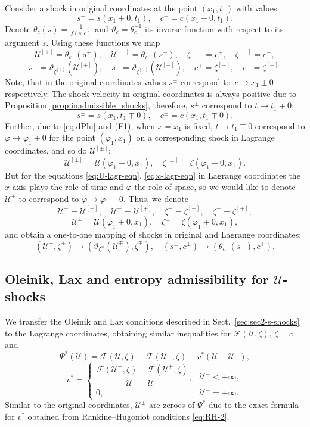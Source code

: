 \documentclass[12pt]{article}
\theoremstyle{definition}
\begin{document}
Consider a shock in original coordinates at the point $(x_1, t_1)$ with values
\[
s^\pm = s(x_1\pm 0, t_1), \quad c^\pm = c(x_1\pm 0, t_1).
\]
Denote $\theta_c(s) = \frac{1}{f(s,c)}$ and $\vartheta_c = \theta_c^{-1}$ its inverse function with respect to its argument $s$. Using these functions we map
\[
\mathcal U^{[+]} = \theta_{c^+}(s^+), \quad \mathcal U^{[-]} = \theta_{c^-}(s^-), \quad \zeta^{[+]} = c^+, \quad \zeta^{[-]} = c^-,
\]
\[s^+ = \vartheta_{\zeta^{[+]}}(\mathcal U^{[+]}), \quad s^- = \vartheta_{\zeta^{[-]}}(\mathcal U^{[-]}), \quad c^+ = \zeta^{[+]}, \quad c^- = \zeta^{[-]}. 
\]
Note, that in the original coordinates values $s^\pm$ correspond to $x\to x_1\pm 0$ respectively. The shock velocity in original coordinates is always positive due to Proposition \ref{prop:inadmissible_shocks}, therefore, $s^\pm$ correspond to $t\to t_1\mp 0$:
\[
s^\pm = s(x_1, t_1 \mp 0), \quad c^\pm = c(x_1, t_1\mp 0).
\]
Further, due to \eqref{eq:dPhi} and (F1), when $x = x_1$ is fixed, $t\to t_1\mp 0$ correspond to $\varphi\to \varphi_1\mp 0$ for the point $(\varphi_1, x_1)$ on a corresponding shock in Lagrange coordinates, and so do $\mathcal U^{[\pm]}$:
\[
\mathcal U^{[\pm]} = \mathcal U(\varphi_1 \mp 0, x_1), \quad \zeta^{[\pm]} = \zeta(\varphi_1 \mp 0, x_1).
\]
But for the equations \eqref{eq:U-lagr-eqn}, \eqref{eq:c-lagr-eqn} in Lagrange coordinates the $x$ axis plays the role of time and $\varphi$ the role of space, so we would like to denote $\mathcal U^\pm$ to correspond to $\varphi\to \varphi_1\pm 0$. Thus, we denote
\[
\mathcal U^+ = \mathcal U^{[-]}, \quad \mathcal U^- = \mathcal U^{[+]}, \quad \zeta^+ = \zeta^{[-]}, \quad \zeta^- = \zeta^{[+]},
\]
\[
\mathcal U^{\pm} = \mathcal U(\varphi_1 \pm 0, x_1), \quad \zeta^{\pm} = \zeta(\varphi_1 \pm 0, x_1),
\]
and obtain a one-to-one mapping of shocks in original and Lagrange coordinates:
\begin{equation}\label{shock_mapping}
(\mathcal U^\pm, \zeta^\pm) \to (\vartheta_{\zeta^\mp}(\mathcal U^\mp), \zeta^\mp), \quad (s^\pm, c^\pm) \to (\theta_{c^\mp}(s^\mp), c^\mp).
\end{equation}
 

\subsection{Oleinik, Lax and entropy admissibility for $\mathcal U$-shocks}
\label{sec:sec2-s-shock-admissibility}


We transfer the Oleinik and Lax conditions described in Sect.~\ref{sec:sec2-s-shocks} to the Lagrange coordinates, obtaining similar inequalities for $\mathcal F(\mathcal U, \zeta)$, $\zeta = c$ and
\[
\Psi^*(\mathcal U) = \mathcal F(\mathcal U, \zeta) - \mathcal F(\mathcal U^-, \zeta) - v^*(\mathcal U - \mathcal U^-),
\]
\[
v^* = 
\begin{cases}
\dfrac{\mathcal F(\mathcal U^-, \zeta) - \mathcal F(\mathcal U^+, \zeta)}{\mathcal U^- - \mathcal U^+}, & \mathcal U^- < +\infty,\\
0, & \mathcal U^- = +\infty.
\end{cases}
\]
Similar to the original coordinates, $\mathcal U^\pm$ are zeroes of $\Psi^*$ due to the exact formula for $v^*$ obtained from Rankine--Hugoniot conditions \eqref{eq:RH-2}.
\end{document}
